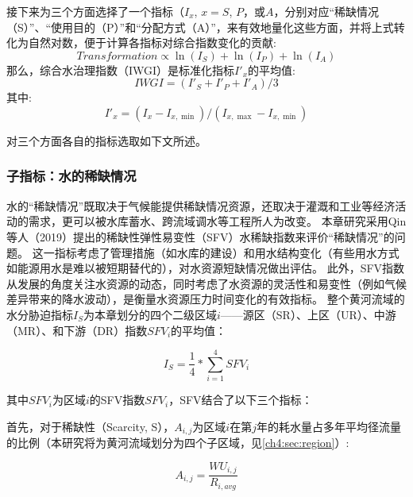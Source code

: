 接下来为三个方面选择了一个指标（$I_x$, $x=S$, $P$，或$A$，分别对应``稀缺情况（S）''、``使用目的（P）''和``分配方式（A）''，来有效地量化这些方面，并将上式转化为自然对数，便于计算各指标对综合指数变化的贡献:
\begin{equation}
    Transformation \propto \ln(I_S) + \ln(I_P) + \ln(I_A)
\end{equation}
那么，综合水治理指数（IWGI）是标准化指标$I'_x$的平均值:
\begin{equation}
    IWGI = (I'_S + I'_P + I'_A) / 3
    \label{ch4:eq:IWGI}
\end{equation}
其中:
\begin{equation}
    I'_x = (I_x - I_{x, \min}) / (I_{x, \max} - I_{x, \min})
\end{equation}

对三个方面各自的指标选取如下文所述。

\subsubsection{子指标：水的稀缺情况}

水的``稀缺情况''既取决于气候能提供稀缺情况资源，还取决于灌溉和工业等经济活动的需求，更可以被水库蓄水、跨流域调水等工程所人为改变\cite{qin2019,wada2014,huang2021}。
本章研究采用Qin等人（2019）提出的稀缺性\textendash{}弹性\textendash{}易变性（SFV）水稀缺指数来评价``稀缺情况''的问题\cite{qin2019}。
这一指标考虑了管理措施（如水库的建设）和用水结构变化（有些用水方式如能源用水是难以被短期替代的），对水资源短缺情况做出评估。
此外，SFV指数从发展的角度关注水资源的动态，同时考虑了水资源的灵活性和易变性（例如气候差异带来的降水波动），是衡量水资源压力\cite{qin2019}时间变化的有效指标。
整个黄河流域的水分胁迫指标$I_S$为本章划分的四个二级区域$i$——源区（SR）、上区（UR）、中游（MR）、和下游（DR）指数$SFV_{i}$的平均值：

\begin{equation}
    I_S = \frac{1}{4} * \sum_{i=1}^4 SFV_{i}
    \label{ch4:eq:scarcity}
\end{equation}

其中$SFV_i$为区域$i$的SFV指数$SFV_i$，SFV结合了以下三个指标：

首先，对于稀缺性（Scarcity, S），$A_{i, j}$为区域$i$在第$j$年的耗水量占多年平均径流量的比例（本研究将为黄河流域划分为四个子区域，见\ref{ch4:sec:region}）:

\begin{equation}
    A_{i, j} = \frac{WU_{i,j}}{R_{i, avg}}
\end{equation}


